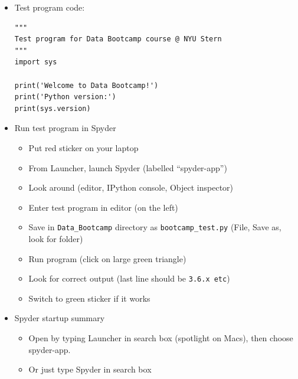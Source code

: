 \begin{itemize}
\item Test program code:

\vspace{-0.1in}
\begin{verbatim}
"""
Test program for Data Bootcamp course @ NYU Stern
"""
import sys

print('Welcome to Data Bootcamp!')
print('Python version:')
print(sys.version)
\end{verbatim}

\item Run test program in Spyder
\begin{itemize}
\item Put red sticker on your laptop
\item From Launcher, launch Spyder (labelled ``spyder-app'')
\item Look around (editor, IPython console, Object inspector)
\item Enter test program in editor (on the left)
\item Save in \verb|Data_Bootcamp| directory as \verb|bootcamp_test.py|
(File, Save as, look for folder)
\item Run program (click on large green triangle)
\item Look for correct output (last line should be {\tt 3.6.x etc})
\item Switch to green sticker if it works
\end{itemize}


\item Spyder startup summary
\begin{itemize}
\item Open by typing Launcher in search box (spotlight on Macs), then choose spyder-app.
\item Or just type Spyder in search box
\end{itemize}
\end{itemize}

